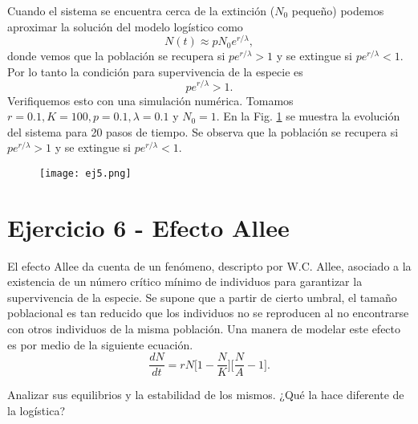 \documentclass[letterpaper,12pt]{article}
\theoremstyle{plain}
\begin{document}
Cuando el sistema se encuentra cerca de la extinción ($N_0$ pequeño) podemos aproximar la solución del modelo logístico como 
\begin{equation}
    N(t) \approx p N_0 e^{r/\lambda},
\end{equation}
donde vemos que la población se recupera si $p e^{r/\lambda} > 1$ y se extingue si $p e^{r/\lambda} < 1$. Por lo tanto la condición para supervivencia de la especie es 
\begin{equation}
    p e^{r/\lambda} > 1.
\end{equation}
Verifiquemos esto con una simulación numérica. Tomamos $r=0.1, K=100, p=0.1, \lambda=0.1$ y $N_0=1$. En la Fig. \ref*{fig:ej5} se muestra la evolución del sistema para 20 pasos de tiempo. Se observa que la población se recupera si $p e^{r/\lambda} > 1$ y se extingue si $p e^{r/\lambda} < 1$.

\begin{figure}[h]
    \centering
    \texttt{[image: ej5.png]}
    \caption{} 
    \label{fig:ej5}
\end{figure}



\section{Ejercicio 6 - Efecto Allee}



El efecto Allee da cuenta de un fenómeno, descripto por W.C. Allee, asociado a la existencia de un número crítico mínimo de individuos para garantizar la supervivencia de la especie. Se supone que a partir de cierto umbral, el tamaño poblacional es tan reducido que los individuos no se reproducen al no encontrarse con otros individuos de la misma población. Una manera de modelar este efecto es por medio de la siguiente ecuación. 
\begin{equation}
    \frac{dN}{dt} = rN \biggr[ 1 - \frac{N}{K} \biggr] \biggr[ \frac{N}{A} -1 \biggr]. 
\end{equation}

Analizar sus equilibrios y la estabilidad de los mismos. ¿Qué la hace diferente de la logística?










\end{document}
